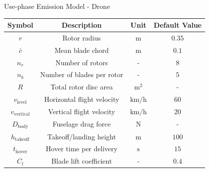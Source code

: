 \documentclass[9pt]{beamer}
\begin{document}
\begin{frame}{Use-phase Emission Model - Drone}
  \begin{center}
    \begin{tabular}{cccc}
      \toprule
      Symbol & Description & Unit & Default Value \\
      \midrule
      $r$ & Rotor radius & $\mathrm{m}$ & $0.35$ \\
      $\bar{c}$ & Mean blade chord & $\mathrm{m}$ & $0.1$ \\
      $n_r$ & Number of rotors & - & $8$ \\
      $n_b$ & Number of blades per rotor & - & $5$ \\
      $R$ & Total rotor disc area & $\mathrm{m^2}$ & - \\
      $v_{\text{level}}$ & Horizontal flight velocity & $\mathrm{km/h}$ & $60$ \\
      $v_{\text{vertical}}$ & Vertical flight velocity & $\mathrm{km/h}$ & $20$ \\
      $D_{\text{body}}$ & Fuselage drag force & $\mathrm{N}$ & - \\
      $h_{\text{takeoff}}$ & Takeoff/landing height & $\mathrm{m}$ & $100$ \\
      $t_{\text{hover}}$ & Hover time per delivery & $\mathrm{s}$ & $15$ \\
      $C_l$ & Blade lift coefficient & - & $0.4$ \\
      \bottomrule
    \end{tabular}
  \end{center}
\end{frame}
\end{document}
